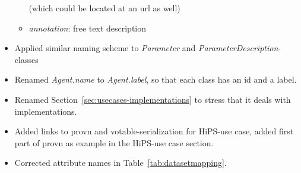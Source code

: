 \documentclass[11pt,a4paper]{ivoa}
\begin{document}
\begin{itemize}
\begin{itemize}
(which could be located at an url as well)
    \item \emph{annotation}: free text description
    \end{itemize}
\item Applied similar naming scheme to \emph{Parameter} and \emph{ParameterDescription}-classes
\item Renamed \emph{Agent.name} to \emph{Agent.label}, so that each class has an id and a label.
\item Renamed Section~\ref{sec:usecases-implementations} to stress that it deals with implementations.
\item Added links to provn and votable-serialization for HiPS-use case, added first part of provn as example in the HiPS-use case section.
\item Corrected attribute names in Table~\ref{tab:datasetmapping}.

\end{itemize}






\end{document}
